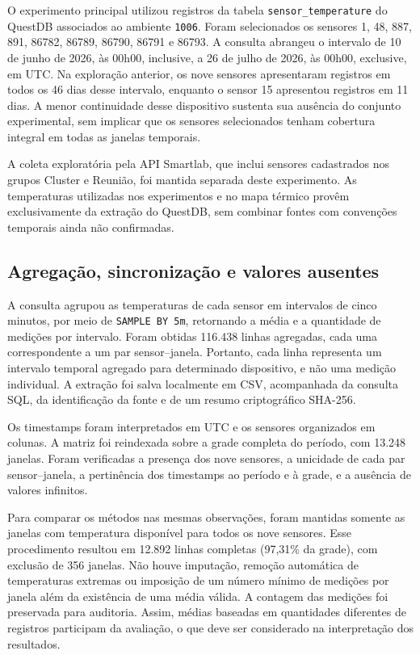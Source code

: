 O experimento principal utilizou registros da tabela
\texttt{sensor\_temperature} do QuestDB associados ao ambiente
\texttt{1006}. Foram selecionados os sensores 1, 48, 887, 891, 86782,
86789, 86790, 86791 e 86793. A consulta abrangeu o intervalo de
10 de junho de 2026, às 00h00, inclusive, a 26 de julho de 2026,
às 00h00, exclusive, em UTC. Na exploração anterior, os nove sensores
apresentaram registros em todos os 46 dias desse intervalo, enquanto
o sensor 15 apresentou registros em 11 dias. A menor continuidade
desse dispositivo sustenta sua ausência do conjunto experimental,
sem implicar que os sensores selecionados tenham cobertura integral
em todas as janelas temporais.

A coleta exploratória pela API Smartlab, que inclui sensores
cadastrados nos grupos Cluster e Reunião, foi mantida separada deste experimento.
As temperaturas utilizadas nos experimentos e no mapa térmico provêm
exclusivamente da extração do QuestDB, sem combinar fontes
com convenções temporais ainda não confirmadas.

\subsection{Agregação, sincronização e valores ausentes}
\label{subsec:preprocessamento}

A consulta agrupou as temperaturas de cada sensor em intervalos de
cinco minutos, por meio de \texttt{SAMPLE BY 5m}, retornando a média
e a quantidade de medições por intervalo. Foram obtidas 116.438 linhas agregadas, cada uma correspondente a um par sensor--janela. Portanto, cada linha representa um intervalo temporal agregado para determinado dispositivo, e não uma medição individual.
A extração foi salva localmente em CSV, acompanhada da consulta SQL,
da identificação da fonte e de um resumo criptográfico SHA-256.

Os timestamps foram interpretados em UTC e os sensores organizados
em colunas. A matriz foi reindexada sobre a grade completa do período,
com 13.248 janelas. Foram verificadas a presença dos nove sensores,
a unicidade de cada par sensor--janela, a pertinência dos timestamps
ao período e à grade, e a ausência de valores infinitos.

Para comparar os métodos nas mesmas observações, foram mantidas
somente as janelas com temperatura disponível para todos os nove
sensores. Esse procedimento resultou em 12.892 linhas completas
(97,31\% da grade), com exclusão de 356 janelas. Não houve imputação,
remoção automática de temperaturas extremas ou imposição de um número
mínimo de medições por janela além da existência de uma média válida.
A contagem das medições foi preservada para auditoria. Assim, médias
baseadas em quantidades diferentes de registros participam da avaliação,
o que deve ser considerado na interpretação dos resultados.

